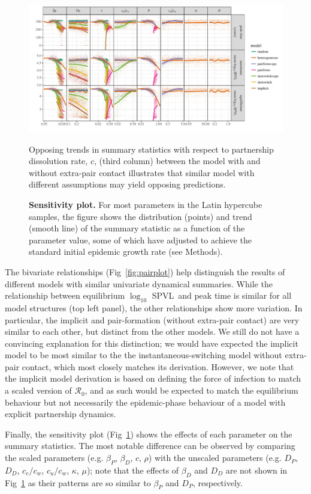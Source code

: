 \documentclass[10pt,letterpaper]{article}
\renewcommand{\figurename}{Fig}
\newcommand{\Lspvl}{$\log_{10}$ SPVL}
\newcommand{\rzero}{{\mathcal R}_0}
\begin{document}
\begin{figure}[!ht]
\includegraphics[width=\textwidth]{../figures/fig5.pdf}
\caption{{\bf Sensitivity plot.}
For most parameters in the Latin hypercube samples, the figure shows the distribution (points) and trend (smooth line) of the summary statistic as a function of the parameter value, some of which have adjusted to achieve the standard initial epidemic growth rate (see Methods).}
Opposing trends in summary statistics with respect to partnership dissolution rate, $c$, (third column) between the model with and without extra-pair contact illustrates that similar model with different assumptions may yield opposing predictions.
\label{fig:plot_sens}
\end{figure}

The bivariate relationships (\figurename~\ref{fig:pairplot}) help distinguish the results of 
different models with similar univariate dynamical summaries. While the
relationship between equilibrium \Lspvl\ and peak time is
similar for all model structures (top left panel), the other
relationships show more variation. In particular, the implicit
and pair-formation (without extra-pair contact) are very similar
to each other, but distinct from the other models. We still do
not have a convincing explanation for this distinction; we
would have expected the implicit model to be most similar to the
the instantaneous-switching model without extra-pair contact,
which most closely matches its derivation. However, we note
that the implicit model derivation is based on defining
the force of infection to match a scaled version of $\rzero$,
and as such would be expected to match the equilibrium behaviour
but not necessarily the epidemic-phase behaviour of a model
with explicit partnership dynamics.

Finally, the sensitivity plot (\figurename~\ref{fig:plot_sens}) shows the effects 
of each parameter on the summary statistics. 
The most notable difference can be observed by comparing the scaled parameters (e.g. $\beta_P$, $\beta_D$, $c$, $\rho$) with the unscaled parameters (e.g. $D_P$, $D_D$, $c_e/c_w$, $c_u/c_w$, $\kappa$, $\mu$);
note that the effects of $\beta_D$ and $D_D$ are not shown in \figurename~\ref{fig:plot_sens} as their patterns are so similar to $\beta_P$ and $D_P$, respectively.
\end{document}
